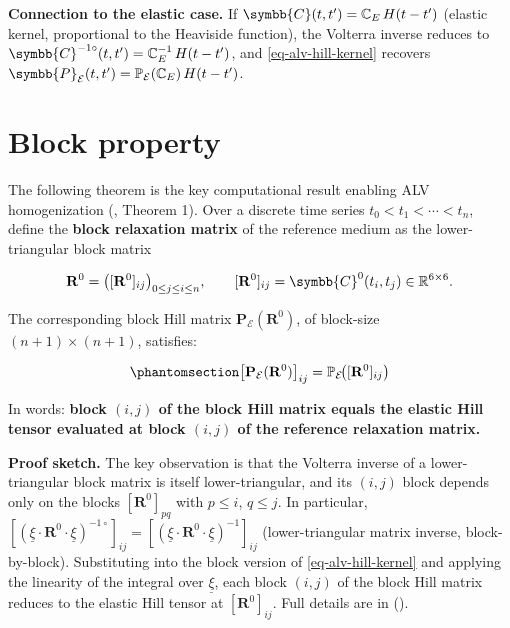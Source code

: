 \documentclass[
  a4paper,
  numbers=noendperiod,
  DIV=12]{scrreprt}
\newcommand{\uuuu}[1]{{\symbb{{#1}}}}
\newcommand{\uv}[1]{{\underline{{#1}}}}
\newcommand{\volt}[1]{{#1}^{-1\circ}}
\begin{document}
\begin{tcolorbox}[enhanced jigsaw, arc=.35mm, bottomrule=.15mm, bottomtitle=1mm, breakable, colback=white, colbacktitle=quarto-callout-note-color!10!white, colframe=quarto-callout-note-color-frame, coltitle=black, left=2mm, leftrule=.75mm, opacityback=0, opacitybacktitle=0.6, rightrule=.15mm, title=\textcolor{quarto-callout-note-color}{\faInfo}\hspace{0.5em}{Note}, titlerule=0mm, toprule=.15mm, toptitle=1mm]

\textbf{Connection to the elastic case.} If
\(\uuuu{C}(t,t') = \mathbb{C}_E\,H(t-t')\) (elastic kernel, proportional
to the Heaviside function), the Volterra inverse reduces to
\(\volt{\uuuu{C}}(t,t') = \mathbb{C}_E^{-1}\,H(t-t')\), and
\ref{eq-alv-hill-kernel} recovers
\(\uuuu{P}_\mathcal{E}(t,t') = \mathbb{P}_\mathcal{E}(\mathbb{C}_E)\,H(t-t')\).

\end{tcolorbox}

\section{Block property}\label{sec-block-hill-property}

The following theorem is the key computational result enabling ALV
homogenization (, Theorem 1). Over a discrete time series
\(t_0 < t_1 < \cdots < t_n\), define the \textbf{block relaxation
matrix} of the reference medium as the lower-triangular block matrix

\[
\mathbf{R}^0 = \bigl([\mathbf{R}^0]_{ij}\bigr)_{0\le j\le i\le n},
\qquad [\mathbf{R}^0]_{ij} = \uuuu{C}^0(t_i,t_j) \in \mathbb{R}^{6\times 6}.
\]

The corresponding block Hill matrix
\(\mathbf{P}_\mathcal{E}(\mathbf{R}^0)\), of block-size
\((n+1)\times(n+1)\), satisfies:

\begin{equation}\protect\phantomsection\label{eq-block-hill-prop}{
\bigl[\mathbf{P}_\mathcal{E}(\mathbf{R}^0)\bigr]_{ij}
= \mathbb{P}_\mathcal{E}\!\bigl([\mathbf{R}^0]_{ij}\bigr)
}\end{equation}

In words: \textbf{block \((i,j)\) of the block Hill matrix equals the
elastic Hill tensor evaluated at block \((i,j)\) of the reference
relaxation matrix.}

\textbf{Proof sketch.} The key observation is that the Volterra inverse
of a lower-triangular block matrix is itself lower-triangular, and its
\((i,j)\) block depends only on the blocks \([\mathbf{R}^0]_{pq}\) with
\(p\le i\), \(q\le j\). In particular,
\([\volt{(\uv{\xi}\cdot\mathbf{R}^0\cdot\uv{\xi})}]_{ij} = [(\uv{\xi}\cdot\mathbf{R}^0\cdot\uv{\xi})^{-1}]_{ij}\)
(lower-triangular matrix inverse, block-by-block). Substituting into the
block version of \ref{eq-alv-hill-kernel} and applying the linearity of
the integral over \(\uv{\xi}\), each block \((i,j)\) of the block Hill
matrix reduces to the elastic Hill tensor at \([\mathbf{R}^0]_{ij}\).
Full details are in ().
\end{document}

